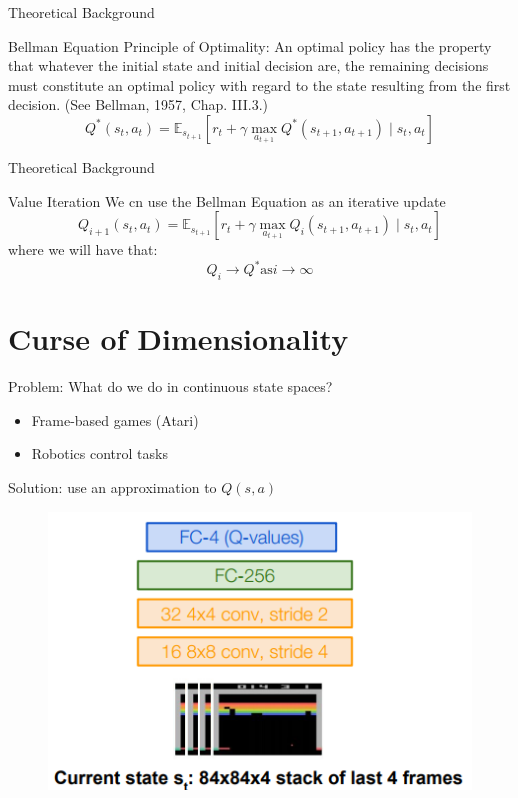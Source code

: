 \documentclass{beamer}
\begin{document}
	\begin{frame}{Theoretical Background}
		\begin{block}{Bellman Equation}
			Principle of Optimality: An optimal policy has the property that whatever the initial state and initial decision are, the remaining decisions must constitute an optimal policy with regard to the state resulting from the first decision. (See Bellman, 1957, Chap. III.3.)
			$$ Q^*(s_t,a_t) = \mathbb{E}_{s_{t+1}} \left[ r_t + \gamma \max_{a_{t+1}} Q^*(s_{t+1},a_{t+1})  \mid s_t,a_t \right] $$
		\end{block}
	\end{frame}
	
	\begin{frame}{Theoretical Background}
		\begin{block}{Value Iteration}
			We cn use the Bellman Equation as an iterative update
			$$ Q_{i+1}(s_t,a_t) = \mathbb{E}_{s_{t+1}} \left[ r_t + \gamma \max_{a_{t+1}} Q_{i}(s_{t+1},a_{t+1})  \mid s_t,a_t \right] $$
			where we will have that:
			$$ Q_i \to Q^* \text{as} i \to \infty $$
		\end{block}
	\end{frame}
	
	\section*{Curse of Dimensionality}
	
	\begin{frame}{Problem: What do we do in continuous state spaces?}
		\begin{itemize}
			\item Frame-based games (Atari)
			\item Robotics control tasks
		\end{itemize}
	\end{frame}
	
	\begin{frame}{Solution: use an approximation to $Q(s, a)$}
		\begin{figure}
			\centering
			\includegraphics[height=0.7\textheight]{dqn_architecture.png}
		\end{figure}
	\end{frame}
	
\end{document}
